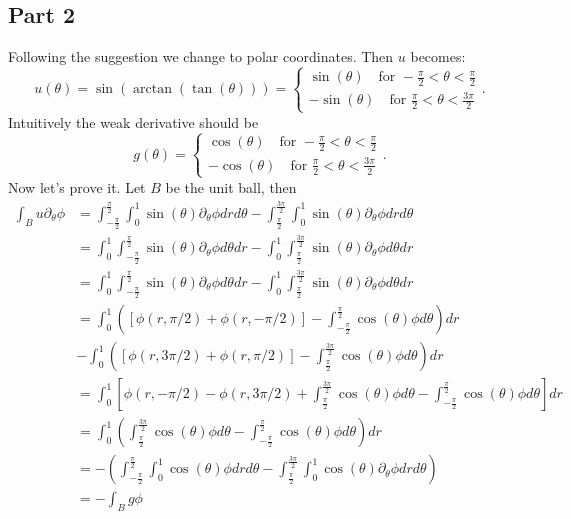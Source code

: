 \documentclass{article}
\begin{document}
\subsection*{Part 2}
Following the suggestion we change to polar coordinates.
Then $u$ becomes:
\[
u(\theta)=\sin(\arctan(\tan(\theta)))=\begin{cases}
	\sin(\theta) \quad \text{for } -\frac{\pi}{2} < \theta < \frac{\pi}{2}\\
	-\sin(\theta) \quad \text{for } \frac{\pi}{2} < \theta < \frac{3\pi}{2}
\end{cases}.
\]
Intuitively the weak derivative should be
\[
g(\theta)=\begin{cases}
	\cos(\theta) \quad \text{for } -\frac{\pi}{2} < \theta < \frac{\pi}{2}\\
	-\cos(\theta) \quad \text{for } \frac{\pi}{2} < \theta < \frac{3\pi}{2}
\end{cases}.
\]
Now let's prove it. Let $B$ be the unit ball, then
\begin{align*}
	\int_{B}u\partial_{\theta}\phi &=\int_{-\frac{\pi}{2}}^{\frac{\pi}{2}} \int_0^1 \sin(\theta)\partial_\theta\phi drd\theta
		      -\int_{\frac{\pi}{2}}^{\frac{3\pi}{2}} \int_0^1 \sin(\theta)\partial_\theta\phi drd\theta\\
		      &=\int_0^1 \int_{-\frac{\pi}{2}}^{\frac{\pi}{2}} \sin(\theta)\partial_\theta\phi d\theta dr
		      -\int_0^1 \int_{\frac{\pi}{2}}^{\frac{3\pi}{2}} \sin(\theta)\partial_\theta\phi d\theta dr\\
		      &=\int_0^1 \int_{-\frac{\pi}{2}}^{\frac{\pi}{2}} \sin(\theta)\partial_\theta\phi d\theta dr
		      -\int_0^1 \int_{\frac{\pi}{2}}^{\frac{3\pi}{2}} \sin(\theta)\partial_\theta\phi d\theta dr\\
		      &=\int_0^1 \left( [\phi(r,\pi/2)+\phi(r,-\pi/2)]- \int_{-\frac{\pi}{2}}^{\frac{\pi}{2}} \cos(\theta)\phi d\theta \right) dr\\
		      &-\int_0^1 \left( [\phi(r,3\pi/2)+\phi(r,\pi/2)]- \int_{\frac{\pi}{2}}^{\frac{3\pi}{2}} \cos(\theta)\phi d\theta \right) dr\\
		      &=\int_0^1 \left[ \phi(r,-\pi/2)-\phi(r,3\pi/2) + \int_{\frac{\pi}{2}}^{\frac{3\pi}{2}} \cos(\theta)\phi d\theta - \int_{-\frac{\pi}{2}}^{\frac{\pi}{2}} \cos(\theta)\phi d\theta \right] dr\\
		      &=\int_0^1 \left(\int_{\frac{\pi}{2}}^{\frac{3\pi}{2}} \cos(\theta)\phi d\theta - \int_{-\frac{\pi}{2}}^{\frac{\pi}{2}} \cos(\theta)\phi d\theta \right) dr\\
		      &=-\left(\int_{-\frac{\pi}{2}}^{\frac{\pi}{2}} \int_0^1 \cos(\theta)\phi drd\theta
		        -\int_{\frac{\pi}{2}}^{\frac{3\pi}{2}} \int_0^1 \cos(\theta)\partial_\theta\phi drd\theta\right)\\
		      &=-\int_{B}g\phi
\end{align*}
\end{document}
